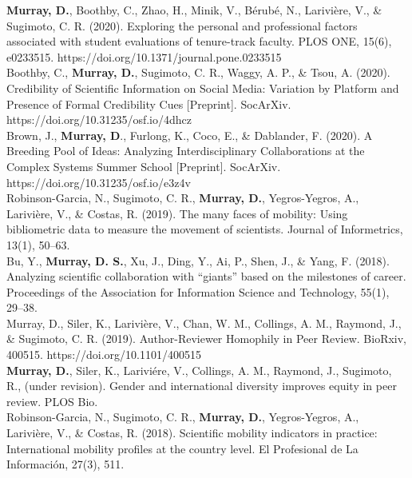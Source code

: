 \documentclass[10pt, a4paper]{article}
\newcommand{\years}[1]{\marginnote{\scriptsize #1}}
\begin{document}
\years{2020} \hangindent=0.7cm \textbf{Murray, D.}, Boothby, C., Zhao, H., Minik, V., Bérubé, N., Larivière, V., \& Sugimoto, C. R. (2020). Exploring the personal and professional factors associated with student evaluations of tenure-track faculty. PLOS ONE, 15(6), e0233515. https://doi.org/10.1371/journal.pone.0233515 \\

\years{2020} \hangindent=0.7cm Boothby, C., \textbf{Murray, D.}, Sugimoto, C. R., Waggy, A. P., \& Tsou, A. (2020). Credibility of Scientific Information on Social Media: Variation by Platform and Presence of Formal Credibility Cues [Preprint]. SocArXiv. https://doi.org/10.31235/osf.io/4dhcz \\

\years{2020} \hangindent=0.7cm Brown, J., \textbf{Murray, D}., Furlong, K., Coco, E., \& Dablander, F. (2020). A Breeding Pool of Ideas: Analyzing Interdisciplinary Collaborations at the Complex Systems Summer School [Preprint]. SocArXiv. https://doi.org/10.31235/osf.io/e3z4v \\

\years{2019} \hangindent=0.7cm Robinson-Garcia, N., Sugimoto, C. R., \textbf{Murray, D.}, Yegros-Yegros, A., Larivière, V., \& Costas, R. (2019). The many faces of mobility: Using bibliometric data to measure the movement of scientists. Journal of Informetrics, 13(1), 50–63. \\

\years{2019} \hangindent=0.7cm Bu, Y., \textbf{Murray, D. S.}, Xu, J., Ding, Y., Ai, P., Shen, J., \& Yang, F. (2018). Analyzing scientific collaboration with “giants” based on the milestones of career. Proceedings of the Association for Information Science and Technology, 55(1), 29–38. \\

\years{2019} Murray, D., Siler, K., Larivière, V., Chan, W. M., Collings, A. M., Raymond, J., \& Sugimoto, C. R. (2019). Author-Reviewer Homophily in Peer Review. BioRxiv, 400515. https://doi.org/10.1101/400515 \\

\years{2018} \hangindent=0.7cm \textbf{Murray, D.}, Siler, K., Lariviére, V., Collings, A. M., Raymond, J., Sugimoto, R., (under revision). Gender and international diversity improves equity in peer review. PLOS Bio. \\

\years{2018} \hangindent=0.7cm Robinson-Garcia, N., Sugimoto, C. R., \textbf{Murray, D.}, Yegros-Yegros, A., Larivière, V., \& Costas, R. (2018). Scientific mobility indicators in practice: International mobility profiles at the country level. El Profesional de La Información, 27(3), 511. \\
\end{document}
